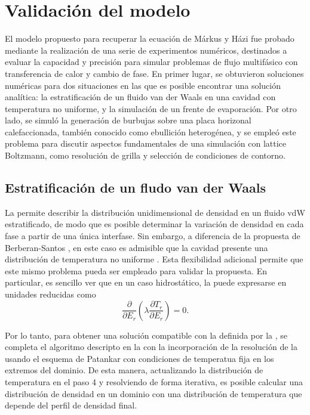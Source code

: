 \section{Validaci\'on del modelo}

El modelo propuesto para recuperar la ecuaci\'on de M\'arkus y H\'azi fue probado mediante la realizaci\'on de una serie de experimentos num\'ericos, destinados a evaluar la capacidad y precisi\'on para simular problemas de flujo multif\'asico con transferencia de calor y cambio de fase. En primer lugar, se obtuvieron soluciones num\'ericas para dos situaciones en las que es posible encontrar una soluci\'on anal\'itica: la estratificaci\'on de un fluido van der Waals en una cavidad con temperatura no uniforme, y la simulaci\'on de un frente de evaporaci\'on. Por otro lado, se simul\'o la generaci\'on de burbujas sobre una placa horizonal calefaccionada, tambi\'en conocido como ebullici\'on heterog\'enea, y se emple\'o este problema para discutir aspectos fundamentales de una simulaci\'on con lattice Boltzmann, como resoluci\'on de grilla y selecci\'on de condiciones de contorno.



\subsection{Estratificaci\'on de un fludo van der Waals}
\label{sec:vdWColumnHT}

La  permite describir la distribuci\'on unidimensional de densidad en un fluido vdW estratificado, de modo que es posible determinar la variaci\'on de densidad en cada fase a partir de una \'unica interfase. Sin embargo, a diferencia de la propuesta de Berberan-Santos \cite{berberan-santos_liquidvapor_2002}, en este caso es admisible que la cavidad presente una distribuci\'on de temperatura no uniforme \cite{fogliatto_simulation_2019}. Esta flexibilidad adicional permite que este mismo problema pueda ser empleado para validar la \lbe{} propuesta. En particular, es sencillo ver que en un caso hidrost\'atico, la  puede expresarse en unidades reducidas como
\begin{equation}
	\dfrac{\partial}{\partial E_r} \left( \lambda \dfrac{\partial T_r}{\partial E_r} \right) = 0.
	\label{eq:markus_1d}
\end{equation}

Por lo tanto, para obtener una soluci\'on compatible con la \lbe{} definida por la , se completa el algoritmo descripto en la  con la incorporaci\'on de la resoluci\'on de la  usando el esquema de Patankar \cite{patankar_numerical_1980} con condiciones de temperatua fija en los extremos del dominio. De esta manera, actualizando la distribuci\'on de temperatura en el paso 4 y resolviendo de forma iterativa, es posible calcular una distribuci\'on de densidad en un dominio con una distribuci\'on de temperatura que depende del perfil de densidad final. 

